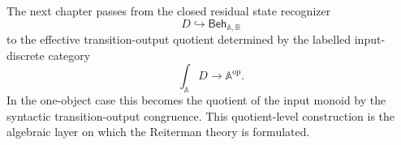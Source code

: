 The next chapter passes from the closed residual state recognizer
\[
D\hookrightarrow\mathsf{Beh}_{\mathbb A,\mathbb B}
\]
to the effective transition-output quotient determined by the labelled
input-discrete category
\[
\int_{\mathbb A}D\longrightarrow\mathbb A^{\mathrm{op}}.
\]
In the one-object case this becomes the quotient of the input monoid by the
syntactic transition-output congruence. This quotient-level construction is
the algebraic layer on which the Reiterman theory is formulated.
